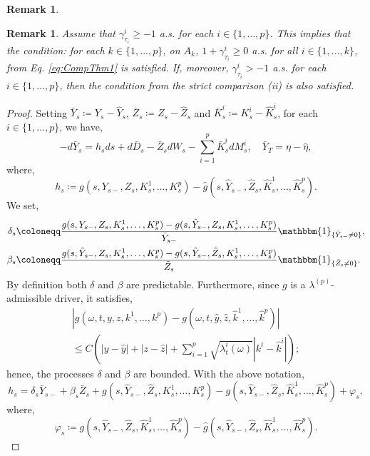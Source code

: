 \documentclass[11pt,a4paper]{article}
\numberwithin{equation}{section}
\theoremstyle{newPlain}
\theoremstyle{newDefinition}
\theoremstyle{newRemark}
\newtheorem{remark}[theorem]{Remark}
\begin{document}
{\begin{remark}
  \end{remark}
\begin{remark}\label{remark:CompThm}
	Assume that  $\gamma_{\tau_i}^i\ge-1$ a.s. for each $i\in\{1,\ldots,p\}$. This implies that  the condition:    for each $k\in\{1,...,p\}$,   on  $A_k$, $1+\gamma_{\tau_i}^i\ge0$  a.s.  for all  $i\in\{1,...,k\}$,  from Eq. \eqref{eq:CompThm1} is satisfied.  If, moreover, $\gamma_{\tau_i}^i>-1$ a.s. for each $i\in\{1,\ldots,p\}$, then  the condition %
	from the strict comparison (ii) is also  satisfied. 
\end{remark}

\begin{proof}
	Setting $\bar{Y}_s \coloneqq Y_s - \hat{Y}_s$, $\bar{Z}_s\coloneqq Z_s - \hat{Z}_s$ and $\bar{K}_s^i\coloneqq K_s^i - \hat{K}_s^i$, for each $i\in\{1,\ldots,p\}$, we have,
    \begin{equation*}
        -d\bar{Y}_s = h_sds + d\bar{D}_s - \bar{Z}_sdW_s - \sum_{i=1}^p\bar{K}_s^idM_s^i,\quad\bar{Y}_T = \eta - \hat{\eta},
    \end{equation*}
    where,
\begin{equation}\label{eq:hequation}
h_s\coloneqq g(s,Y_{s-},Z_s,K_s^1,\ldots,K_s^p)-\hat{g}(s,\hat{Y}_{s-},\hat{Z}_s,\hat{K}_s^1,\ldots,\hat{K}_s^p).
\end{equation}
    We set,
    \begin{align}\label{eq:deltaequation}
	\begin{aligned}
	        \delta_s&\coloneqq\frac{g(s,Y_{s-},Z_s,K_s^1,\ldots,K_s^p) - g(s,\hat{Y}_{s-},Z_s,K_s^1,\ldots,K_s^p)}{\bar{Y}_{s-}}\mathbbm{1}_{\{\bar{Y}_{s-}\ne0\}},\\
	        \beta_s&\coloneqq\frac{g(s,\hat{Y}_{s-},Z_s,K_s^1,\ldots,K_s^p)-g(s,\hat{Y}_{s-},\hat{Z}_s,K_s^1,\ldots, K_s^p)}{\bar{Z}_s}\mathbbm{1}_{\{\bar{Z}_{s}\ne0\}}.
	\end{aligned}
    \end{align}
By definition both $\delta$ and $\beta$ are predictable. Furthermore, since $g$ is a $\lambda^{(p)}$-admissible driver,  it satisfies,
\begin{multline*}
    |g(\omega,t,y,z,k^1,\ldots,k^p) - g(\omega, t, \hat{y}, \hat{z}, \hat{k}^1,\ldots,\hat{k}^p)|
    \\\le C\left(|y-\hat{y}| + |z-\hat{z}| + \sum_{i=1}^p\sqrt{\lambda_t^i(\omega)}|k^i-\hat{k}^i|\right);
\end{multline*}
hence, the processes $\delta$ and $\beta$ are bounded. With the above notation,
\begin{equation*}
    h_s = \delta_s\bar{Y}_{s-} + \beta_s\bar{Z}_s + g(s,\hat{Y}_{s-},\hat{Z}_s,K_s^1,\ldots,K_s^p) - g(s,\hat{Y}_{s-},\hat{Z}_s,\hat{K}_s^1,\ldots,\hat{K}_s^p) + \varphi_s,
\end{equation*}
where,
\begin{equation}\label{eq:varphi1}
	\varphi_s \coloneqq g(s,\hat{Y}_{s-},\hat{Z}_s,\hat{K}_s^1,\ldots,\hat{K}_s^p) - \hat{g}(s,\hat{Y}_{s-},\hat{Z}_s,\hat{K}_s^1,\ldots,\hat{K}_s^p).
\end{equation}


\end{proof}}
\end{document}
